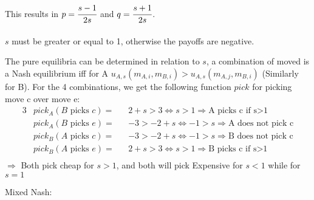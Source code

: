         This results in $p=\cfrac{s-1}{2s}$ and $q=\cfrac{s+1}{2s}$. \\
        \\
        $s$ must be greater or equal to 1, otherwise the payoffs are negative. \\
        \par
        The pure equilibria can be determined in relation to $s$, a combination of moved is a Nash equilibrium iff for A $u_{A,s}(m_{A,i}, m_{B,i})>u_{A,s}(m_{A,j}, m_{B,i})$ (Similarly for B).
        For the 4 combinations, we get the following function $pick$ for picking move c over move e:
        \begin{alignat*}{3}
            &pick_A(B \text{ picks } c)=&& 2+s>3 \Leftrightarrow s>1 \Rightarrow \text{A picks c if s>1}\\
            &pick_A(B \text{ picks } e)=&& -3>-2+s \Leftrightarrow -1>s \Rightarrow \text{A does not pick c}\\
            &pick_B(A \text{ picks } c)=&& -3>-2+s \Leftrightarrow -1>s \Rightarrow \text{B does not pick c}\\
            &pick_B(A \text{ picks } e)=&& 2+s>3 \Leftrightarrow s>1 \Rightarrow \text{B picks c if s>1}\\
        \end{alignat*}
        $\Rightarrow$ Both pick cheap for $s>1$, and both will pick Expensive for $s<1$ while for $s=1$
        \par Mixed Nash:


   
